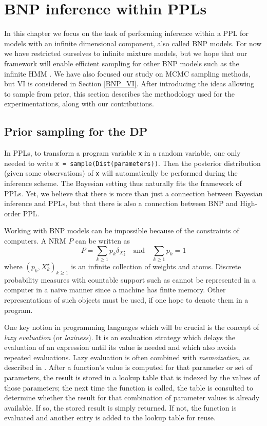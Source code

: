 
\chapter{BNP inference within PPLs} \label{BNP_PPL}
In this chapter we focus on the task of performing inference within a \gls{PPL} for models with an infinite dimensional component, also called \gls{BNP} models.
For now we have restricted ourselves to infinite mixture models, but we hope that our framework will enable efficient sampling for other \gls{BNP} models such as the infinite \acrlong{HMM} \cite{Beal02theinfinite}. We have also focused our study on \gls{MCMC} sampling methods, but \acrlong{VI} is considered in Section \ref{BNP_VI}. After introducing the ideas allowing to sample from  prior, this section describes the methodology used for the experimentations, along with our contributions.

\section{Prior sampling for the \acrlong{DP}} \label{recursion}

In \glspl{PPL}, to transform a program variable \texttt{x} in a random variable, one only needed to write \texttt{x = sample(Dist(parameters))}. Then the posterior distribution (given some observations) of \texttt{x} will automatically be performed during the inference scheme.
The Bayesian setting thus naturally fits the framework of \glspl{PPL}.
Yet, we believe that there is more  than just a connection between Bayesian inference and \glspl{PPL}, but that there is also a connection between \acrlong{BNP} and High-order \gls{PPL}.

Working with \gls{BNP} models can be impossible because of the constraints of computers.
A \gls{NRM} $P$ can be written \cite{Kingman:1967kn} as
$$P = \sum_{k \ge 1}{{p}_k \delta_{X^\star_k}} \quad \text{and} \quad \sum_{k \ge 1}{p_k}=1$$
where $\left({p}_k, X^\star_k \right)_{k \ge 1}$ is an infinite collection of weights and atoms.
Discrete probability measures with countable support such as  cannot be represented in a computer in a naïve manner since a machine has finite memory.
Other representations of such objects must be used, if one hope to denote them in a program.

One key notion in programming languages which will be crucial is the concept of \textit{lazy evaluation} (or \textit{laziness}). It is an evaluation strategy which delays the evaluation of an expression until its value is needed and which also avoids repeated evaluations.
Lazy evaluation is often combined with \textit{memoization}, as described in \cite{Bentley:1982:WEP:539147}. After a function's value is computed for that parameter or set of parameters, the result is stored in a lookup table that is indexed by the values of those parameters; the next time the function is called, the table is consulted to determine whether the result for that combination of parameter values is already available. If so, the stored result is simply returned. If not, the function is evaluated and another entry is added to the lookup table for reuse.

